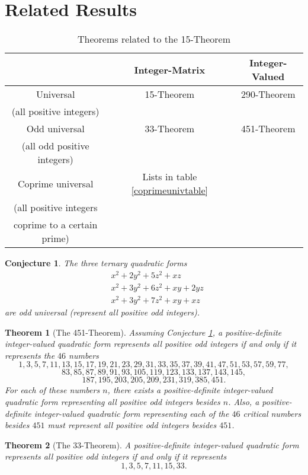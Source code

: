 \documentclass[letterpaper, 12pt]{article}
\newtheorem{thm}{Theorem}
\newtheorem{conj}{Conjecture}
\begin{document}
\section{Related Results}

\begin{table}[H]
    \begin{tabular}{|c|c|c|}
        \hline
        & Integer-Matrix & Integer-Valued \\ \hline
        Universal & 15-Theorem & 290-Theorem \\
        (all positive integers) && \\ \hline
        Odd universal & 33-Theorem & 451-Theorem \\
        (all odd positive integers) && \\ \hline
        Coprime universal & Lists in table \ref{coprimeunivtable} & \\
        (all positive integers && \\
        coprime to a certain prime) && \\ \hline
    \end{tabular}
    \caption{Theorems related to the 15-Theorem}
\end{table}
\begin{conj}\label{451thmconj}
    The three ternary quadratic forms
    \begin{align*}
        & x^2 + 2y^2 + 5z^2 + xz \\
        & x^2 + 3y^2 + 6z^2 + xy + 2yz \\
        & x^2 + 3y^2 + 7z^2 + xy + xz
    \end{align*}
    are odd universal (represent all positive odd integers).
\end{conj}
\begin{thm}[The 451-Theorem]
    Assuming Conjecture \ref{451thmconj}, a positive-definite integer-valued quadratic form represents all positive \emph{odd} integers if and only if it represents the $46$ numbers
    \[1, 3, 5, 7, 11, 13, 15, 17, 19, 21, 23, 29, 31, 33, 35, 37, 39, 41, 47, 51, 53, 57, 59, 77,\]
    \[83, 85, 87, 89, 91, 93, 105, 119, 123, 133, 137, 143, 145,\]
    \[187, 195, 203, 205, 209, 231, 319, 385, 451.\]
    For each of these numbers $n$, there exists a positive-definite integer-valued quadratic form representing all positive odd integers besides $n$. Also, a positive-definite integer-valued quadratic form representing each of the $46$ critical numbers besides $451$ must represent all positive odd integers besides $451$.
\end{thm}
\begin{thm}[The 33-Theorem]
    A positive-definite integer-valued quadratic form represents all positive odd integers if and only if it represents
    \[1, 3, 5, 7, 11, 15, 33.\]
\end{thm}
\end{document}
